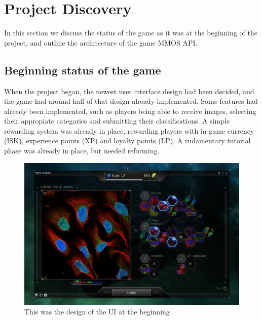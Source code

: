 \section{Project Discovery}\label{sec:project_discovery}
In this section we discuss the status of the game as it was at the beginning of the project, and outline the architecture of the game  MMOS API.
\subsection{Beginning status of the game}
When the project began, the newest user interface design had been decided, and the game had around half of that design already implemented. Some features had already been implemented, such as players being able to receive images, selecting their appropiate categories and submitting their classifications. A simple rewarding system was already in place, rewarding players with in game currency (ISK), experience points (XP) and loyalty points (LP). A rudamentary tutorial phase was already in place, but needed reforming.\\

\begin{figure}[p]
	\centering
	\graphicspath{ {./graphics/} }
    \centerline{\includegraphics[width=15cm]{PD.png}}
    \caption{\label{fig:PD}This was the design of the UI at the beginning}
\end{figure}